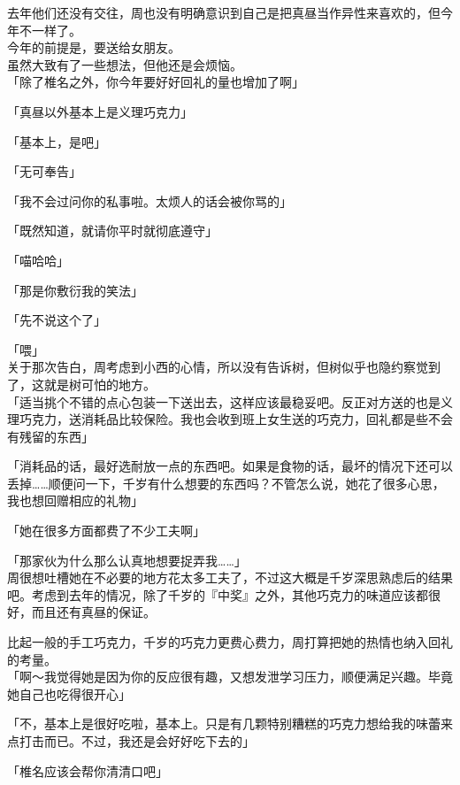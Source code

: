 去年他们还没有交往，周也没有明确意识到自己是把真昼当作异性来喜欢的，但今年不一样了。\\

今年的前提是，要送给女朋友。\\

虽然大致有了一些想法，但他还是会烦恼。\\

「除了椎名之外，你今年要好好回礼的量也增加了啊」

「真昼以外基本上是义理巧克力」

「基本上，是吧」

「无可奉告」

「我不会过问你的私事啦。太烦人的话会被你骂的」

「既然知道，就请你平时就彻底遵守」

「喵哈哈」

「那是你敷衍我的笑法」

「先不说这个了」

「喂」\\

关于那次告白，周考虑到小西的心情，所以没有告诉树，但树似乎也隐约察觉到了，这就是树可怕的地方。\\

「适当挑个不错的点心包装一下送出去，这样应该最稳妥吧。反正对方送的也是义理巧克力，送消耗品比较保险。我也会收到班上女生送的巧克力，回礼都是些不会有残留的东西」

「消耗品的话，最好选耐放一点的东西吧。如果是食物的话，最坏的情况下还可以丢掉……顺便问一下，千岁有什么想要的东西吗？不管怎么说，她花了很多心思，我也想回赠相应的礼物」

「她在很多方面都费了不少工夫啊」

「那家伙为什么那么认真地想要捉弄我……」\\

周很想吐槽她在不必要的地方花太多工夫了，不过这大概是千岁深思熟虑后的结果吧。考虑到去年的情况，除了千岁的『中奖』之外，其他巧克力的味道应该都很好，而且还有真昼的保证。

比起一般的手工巧克力，千岁的巧克力更费心费力，周打算把她的热情也纳入回礼的考量。\\

「啊～我觉得她是因为你的反应很有趣，又想发泄学习压力，顺便满足兴趣。毕竟她自己也吃得很开心」

「不，基本上是很好吃啦，基本上。只是有几颗特别糟糕的巧克力想给我的味蕾来点打击而已。不过，我还是会好好吃下去的」

「椎名应该会帮你清清口吧」

